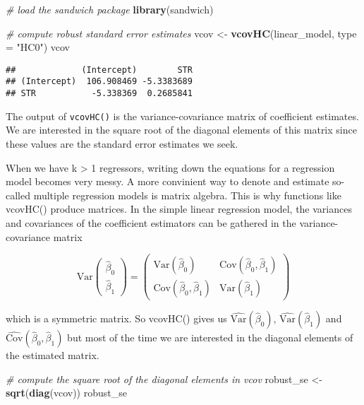 \documentclass[]{book}
\newenvironment{Shaded}{\begin{snugshade}}{\end{snugshade}}
\newcommand{\KeywordTok}[1]{\textcolor[rgb]{0.13,0.29,0.53}{\textbf{#1}}}
\newcommand{\DataTypeTok}[1]{\textcolor[rgb]{0.13,0.29,0.53}{#1}}
\newcommand{\StringTok}[1]{\textcolor[rgb]{0.31,0.60,0.02}{#1}}
\newcommand{\CommentTok}[1]{\textcolor[rgb]{0.56,0.35,0.01}{\textit{#1}}}
\newcommand{\NormalTok}[1]{#1}
\theoremstyle{definition}
\theoremstyle{definition}
\theoremstyle{definition}
\theoremstyle{remark}
\let\BeginKnitrBlock\begin \let\EndKnitrBlock\end
\begin{document}
\begin{Shaded}
\begin{Highlighting}[]
\CommentTok{# load the sandwich package}
\KeywordTok{library}\NormalTok{(sandwich)}

\CommentTok{# compute robust standard error estimates}
\NormalTok{vcov <-}\StringTok{ }\KeywordTok{vcovHC}\NormalTok{(linear_model, }\DataTypeTok{type =} \StringTok{"HC0"}\NormalTok{)}
\NormalTok{vcov}
\end{Highlighting}
\end{Shaded}

\begin{verbatim}
##             (Intercept)        STR
## (Intercept)  106.908469 -5.3383689
## STR           -5.338369  0.2685841
\end{verbatim}

The output of \texttt{vcovHC()} is the variance-covariance matrix of
coefficient estimates. We are interested in the square root of the
diagonal elements of this matrix since these values are the standard
error estimates we seek.

\BeginKnitrBlock{rmdknit}
When we have k \textgreater{} 1 regressors, writing down the equations
for a regression model becomes very messy. A more convinient way to
denote and estimate so-called multiple regression models is matrix
algebra. This is why functions like vcovHC() produce matrices. In the
simple linear regression model, the variances and covariances of the
coefficient estimators can be gathered in the variance-covariance matrix

\begin{equation}
\text{Var}
  \begin{pmatrix}
    \hat\beta_0 \\
    \hat\beta_1
  \end{pmatrix} = 
\begin{pmatrix}
  \text{Var}(\hat\beta_0) & \text{Cov}(\hat\beta_0,\hat\beta_1) \\
\text{Cov}(\hat\beta_0,\hat\beta_1) & \text{Var}(\hat\beta_1)
\end{pmatrix}
\end{equation}

which is a symmetric matrix. So vcovHC() gives us
\(\widehat{\text{Var}}(\hat\beta_0)\),
\(\widehat{\text{Var}}(\hat\beta_1)\) and
\(\widehat{\text{Cov}}(\hat\beta_0,\hat\beta_1)\) but most of the time
we are interested in the diagonal elements of the estimated matrix.
\EndKnitrBlock{rmdknit}

\begin{Shaded}
\begin{Highlighting}[]
\CommentTok{# compute the square root of the diagonal elements in vcov}
\NormalTok{robust_se <-}\StringTok{ }\KeywordTok{sqrt}\NormalTok{(}\KeywordTok{diag}\NormalTok{(vcov))}
\NormalTok{robust_se}
\end{Highlighting}
\end{Shaded}
\end{document}
